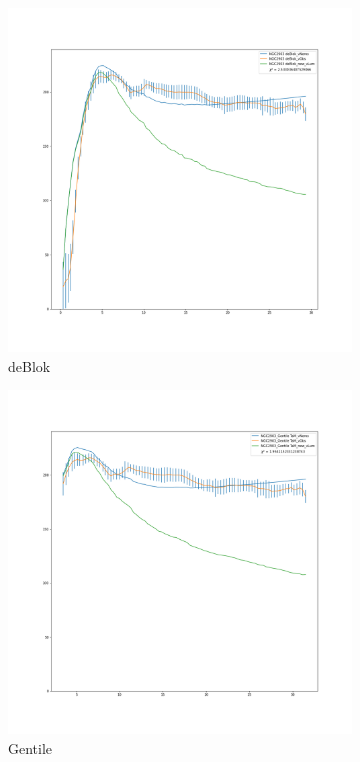 \documentclass[reprint,%
 amsmath,amssymb,
 aps,
]{revtex4-1}
\begin{document}
  \begin{figure}[h]
\begin{subfigure}{.5\textwidth}
  \centering
  \includegraphics[width=.8\linewidth]{NGC2903deBlok_XueSofue.png}
  \caption{deBlok\cite{Blok1}}
  \label{fig:sfig14}
\end{subfigure}%
\begin{subfigure}{.5\textwidth}
  \centering
  \includegraphics[width=.8\linewidth]{NGC2903_GentileTaM_XueSofue.png}
  \caption{Gentile\cite{Gent}}
  \label{fig:sfig15}
\end{subfigure}
\begin{subfigure}{.5\textwidth}

\end{subfigure}
\end{figure}
\end{document}
